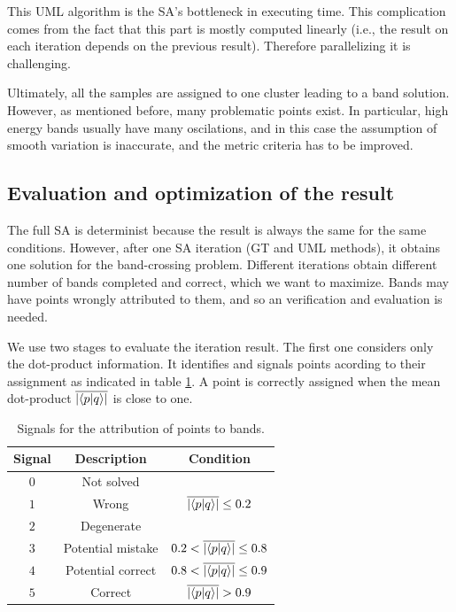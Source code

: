 \documentclass[a4paper,12pt]{report}
\begin{document}
\begin{appendices}
This UML algorithm is the SA's bottleneck in executing time. This complication comes from the fact that this part is mostly computed linearly (i.e., the result on each iteration depends on the previous result). Therefore parallelizing it is challenging.

Ultimately, all the samples are assigned to one cluster leading to a band solution.
However, as mentioned before, many problematic points exist.
In particular, high energy bands usually have many oscilations, and in this case the assumption of smooth variation is inaccurate, and the metric criteria has to be improved.





\subsection{Evaluation and optimization of the result}
The full SA is determinist because the result is always the same for the same conditions. However, after one SA iteration (GT and UML methods), it obtains one solution for the band-crossing problem.
Different iterations obtain different number of bands completed and correct, which we want to maximize.
Bands may have points wrongly attributed to them, and so an verification and evaluation is needed.

We use two stages to evaluate the iteration result.
The first one considers only the dot-product information.
It identifies and signals points acording to their assignment as indicated in table \ref{tab:signals1}.
A point is correctly assigned when the mean dot-product $\overline{\left|\braket{p}{q}\right|}$ is close to one.

\begin{table}[H]
    \center
    \caption{Signals for the attribution of points to bands.}\label{tab:signals1}
    \begin{tabular}{ccc}
        \hline
        Signal & Description       & Condition                                  \\\hline
        $0$    & Not solved        &                                            \\
        $1$    & Wrong             & $\overline{\left|\braket{p}{q}\right|} \leq 0.2$        \\
        $2$    & Degenerate        &                                            \\
        $3$    & Potential mistake & $0.2 < \overline{\left|\braket{p}{q}\right|} \leq 0.8$  \\
        $4$    & Potential correct & $0.8 < \overline{\left|\braket{p}{q}\right|} \leq 0.9 $ \\
        $5$    & Correct           & $\overline{\left|\braket{p}{q}\right|} > 0.9$           \\\hline
    \end{tabular}
\end{table}


\end{appendices}
\end{document}
